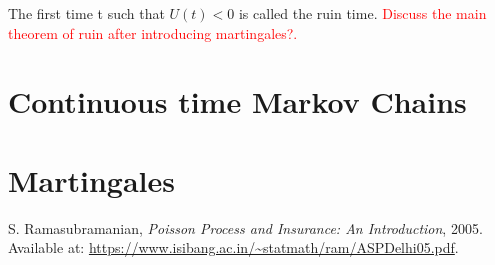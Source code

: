 \documentclass[letterpaper, 12pt]{article}
\newcommand{\1}{\mathds{1}} %
\theoremstyle{definition}
\begin{document}
The first time t such that $U(t)<0$ is called the ruin time. \textcolor{red}{Discuss the main theorem of ruin after introducing martingales?.}

\section{Continuous time Markov Chains}
\label{sec:CTMC}


\section{Martingales}
\label{sec:Mart}

\begin{thebibliography}{9}
S. Ramasubramanian, \emph{Poisson Process and Insurance: An Introduction}, 2005. Available at: \url{https://www.isibang.ac.in/~statmath/ram/ASPDelhi05.pdf}.

\end{thebibliography}
\end{document}
